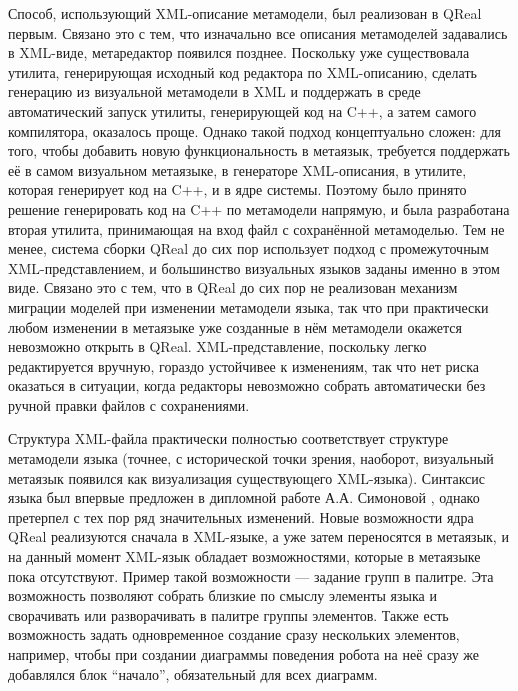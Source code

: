 Способ, использующий XML-описание метамодели, был реализован в QReal первым. Связано 
это с тем, что изначально все описания метамоделей задавались в XML-виде, метаредактор 
появился позднее. Поскольку уже существовала утилита, генерирующая исходный код редактора 
по XML-описанию, сделать генерацию из визуальной метамодели в XML и поддержать в среде 
автоматический запуск утилиты, генерирующей код на C++, а затем самого компилятора, 
оказалось проще. Однако такой подход концептуально сложен: для того, чтобы добавить 
новую функциональность в метаязык, требуется поддержать её в самом визуальном метаязыке, 
в генераторе XML-описания, в утилите, которая генерирует код на C++, и в ядре системы. 
Поэтому было принято решение генерировать код на C++ по метамодели напрямую, и была 
разработана вторая утилита,  принимающая на вход файл с сохранённой метамоделью. Тем 
не менее, система сборки QReal до сих пор использует подход с промежуточным XML-представлением, 
и большинство визуальных языков заданы именно в этом виде. Связано это с тем, что в 
QReal до сих пор не реализован механизм миграции моделей при изменении метамодели 
языка, так что при практически любом изменении в метаязыке уже созданные в нём метамодели 
окажется невозможно открыть в QReal. XML-представление, поскольку легко редактируется 
вручную, гораздо устойчивее к изменениям, так что нет риска оказаться в ситуации, когда 
редакторы невозможно собрать автоматически без ручной правки файлов с сохранениями. 

Структура XML-файла практически полностью соответствует структуре метамодели языка 
(точнее, с исторической точки зрения, наоборот, визуальный метаязык появился как визуализация 
существующего XML-языка). Синтаксис языка был впервые предложен в дипломной работе 
А.А. Симоновой
, однако претерпел с тех пор ряд значительных изменений. Новые возможности ядра QReal 
реализуются сначала в XML-языке, а уже затем переносятся в метаязык, и на данный момент 
XML-язык обладает возможностями, которые в метаязыке пока отсутствуют. Пример такой 
возможности --- задание групп в палитре. Эта возможность позволяют собрать близкие 
по смыслу элементы языка и сворачивать или разворачивать в палитре группы элементов. 
Также есть возможность задать одновременное создание сразу нескольких элементов, например, 
чтобы при создании диаграммы поведения робота на неё сразу же добавлялся блок "`начало"', 
обязательный для всех диаграмм.


